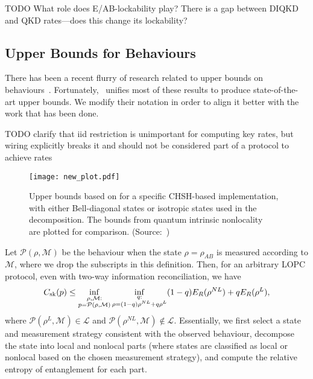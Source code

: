 \documentclass[10pt, a4paper]{article}
\numberwithin{equation}{section} %
\theoremstyle{definition}
\theoremstyle{plain}
\newcommand{\?}{\mathrel{?}} %
\newcommand{\sM}{\mathcal{M}}
\newcommand{\cP}{\mathcal{P}}
\newcommand{\Ls}{\mathcal{L}}
\newcommand{\sk}{\rm sk}
\begin{document}
        TODO What role does E/AB-lockability play? There is a gap between DIQKD and QKD rates---does this change its lockability?

      \subsection{Upper Bounds for Behaviours}

      There has been a recent flurry of research related to upper bounds on behaviours~\cite{NotSufficient, RevisedPeres, DIQKD_QKD_Gap, CCSquashedEntangle, DIQKD_Limits}. Fortunately,~\cite{CCSquashedEntangle} unifies most of these results to produce state-of-the-art upper bounds. We modify their notation in order to align it better with the work that has been done.

      TODO clarify that iid restriction is unimportant for computing key rates, but wiring explicitly breaks it and should not be considered part of a protocol to achieve rates

      \begin{figure}
        \centering
        \texttt{[image: new\_plot.pdf]}
        \caption{\label{fig:genubound} Upper bounds based on  for a specific CHSH-based implementation, with either Bell-diagonal states or isotropic states used in the decomposition. The bounds from quantum intrinsic nonlocality~\cite{DIQKD_Limits}~\cite[Appendix B]{RevisedPeres} are plotted for comparison. (Source:~\cite{CCSquashedEntangle})}
      \end{figure}

      Let \(\cP(\rho, \sM)\) be the behaviour when the state \(\rho = \rho_{A B}\) is measured according to \(\sM\), where we drop the subscripts in this definition. Then, for an arbitrary LOPC protocol, even with two-way information reconciliation, we have~\cite[Thm. 3]{CCSquashedEntangle}
      \begin{equation}\label{eqn:genubound}
        C_{\sk}(p) \leq \inf_{\substack{\rho, \sM : \\ p = \cP(\rho, \sM) }} \inf_{\substack{q : \\ \rho = (1-q)\rho^{NL} + q\rho^L}} (1-q) E_R(\rho^{NL}) + q E_R(\rho^L),
      \end{equation}
      where \(\cP(\rho^L, \sM) \in \Ls\) and \(\cP(\rho^{NL}, \sM) \not\in \Ls\). Essentially, we first select a state and measurement strategy consistent with the observed behaviour, decompose the state into local and nonlocal parts (where states are classified as local or nonlocal based on the chosen measurement strategy), and compute the relative entropy of entanglement for each part.
\end{document}
